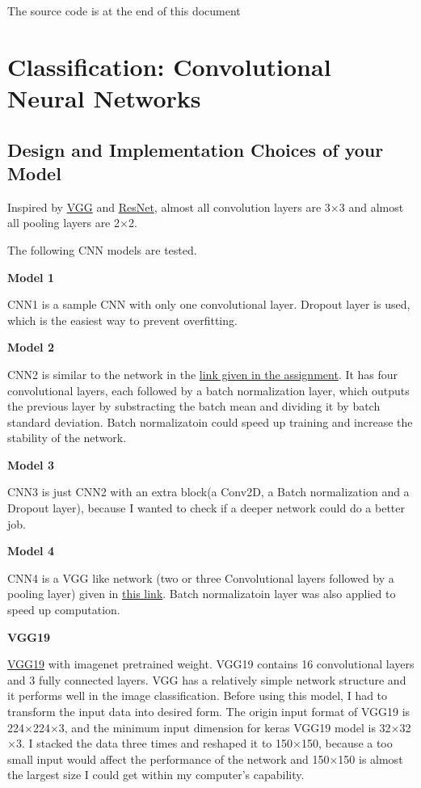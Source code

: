 \documentclass[12pt]{article}
\begin{document}
\noindent
{\LARGE The source code is at the end of this document}
\section{Classification: Convolutional Neural Networks}

\subsection{Design and Implementation Choices of your Model}

Inspired by \href{https://arxiv.org/pdf/1409.1556.pdf}{VGG} and \href{https://arxiv.org/pdf/1512.03385.pdf}{ResNet}, almost all convolution layers are 3$\times$3 and almost all pooling layers are 2$\times$2.

The following CNN models are tested. 

\textbf{Model 1}

CNN1 is a sample CNN with only one convolutional layer. Dropout layer is used, which is the easiest way to prevent overfitting.

\textbf{Model 2}

CNN2 is similar to the network in the \href{https://www.kaggle.com/fuzzywizard/fashion-mnist-cnn-keras-accuracy-93/}{link given in the assignment}. It has four convolutional layers, each followed by a batch normalization layer, which outputs the previous layer by substracting the batch mean and dividing it by batch standard deviation. Batch normalizatoin could speed up training and increase the stability of the network.

\textbf{Model 3}

CNN3 is just CNN2 with an extra block(a Conv2D, a Batch normalization and a Dropout layer), because I wanted to check if a deeper network could do a better job.

\textbf{Model 4}

CNN4 is a VGG like network (two or three Convolutional layers followed by a pooling layer) given in \href{http://proc-x.com/2017/09/a-vgg-like-cnn-for-fashion-mnist-with-94-accuracy/}{this link}. Batch normalizatoin layer was also applied to speed up computation.

\textbf{VGG19}

\href{https://arxiv.org/pdf/1409.1556.pdf}{VGG19} with imagenet pretrained weight. VGG19 contains 16 convolutional layers and 3 fully connected layers. VGG has a relatively simple network structure and it performs well in the image classification. Before using this model, I had to transform the input data into desired form. The origin input format of VGG19 is 224$\times$224$\times$3, and the minimum input dimension for keras VGG19 model is 32$\times$32$\times$3. I stacked the data three times and reshaped it to 150$\times$150, because a too small input would affect the performance of the network and 150$\times$150 is almost the largest size I could get within my computer's capability.
\end{document}
